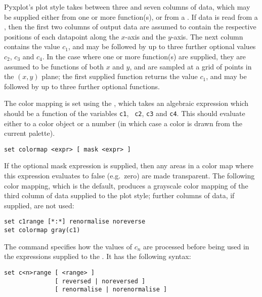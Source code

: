 Pyxplot's  plot style takes between three and seven columns
of data, which may be supplied either from one or more function(s), or from a
\datafile. If data is read from a \datafile, then the first two columns of
output data are assumed to contain the respective positions of each datapoint
along the $x$-axis and the $y$-axis. The next column contains the value $c_1$,
and may be followed by up to three further optional values $c_2$, $c_3$ and
$c_4$. In the case where one or more function(s) are supplied, they are assumed
to be functions of both $x$ and $y$, and are sampled at a grid of points in the
$(x,y)$ plane; the first supplied function returns the value $c_1$, and may be
followed by up to three further optional functions.

The color mapping is set using the , which takes an
algebraic expression which should be a function of the variables {\tt c1}, {\tt
c2}, {\tt c3} and {\tt c4}. This should evaluate either to a color object or a
number (in which case a color is drawn from the current palette).

\begin{verbatim}
set colormap <expr> [ mask <expr> ]
\end{verbatim}

\noindent If the optional mask expression is supplied, then any areas in a
color map where this expression evaluates to false (e.g.\ zero) are made
transparent. The following color mapping, which is the default, produces a
grayscale color mapping of the third column of data supplied to the
 plot style; further columns of data, if supplied, are not
used:

\begin{verbatim}
set c1range [*:*] renormalise noreverse
set colormap gray(c1)
\end{verbatim}

The  command specifies how the values of $c_n$ are
processed before being used in the expressions supplied to the . It has the following syntax:

\begin{verbatim}
set c<n>range [ <range> ]
              [ reversed | noreversed ]
              [ renormalise | norenormalise ]
\end{verbatim}

